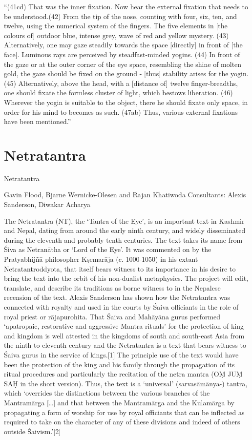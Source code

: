 ``(41cd) That was the inner fixation. Now hear the external fixation that needs to be understood.(42) From the tip of the nose, counting with four, six, ten, and twelve, using the numerical system of the fingers. The five elements in [the colours of] outdoor blue, intense grey, wave of red and yellow mystery. (43) Alternatively, one may gaze steadily towards the space [directly] in front of [the face]. Luminous rays are perceived by steadfast-minded yogins. (44) In front of the gaze or at the outer corner of the eye space, resembling the shine of molten gold, the gaze should be fixed on the ground - [thus] stability arises for the yogin. (45) Alternatively, above the head, with a [distance of] twelve finger-breadths, one should fixate the formless cluster of light, which bestows liberation. (46) Wherever the yogin is suitable to the object, there he should fixate only space, in order for his mind to becomes as such. (47ab) Thus, various external fixations have been mentioned.''
\section{Netratantra}

Netratantra

Gavin Flood, Bjarne Wernicke-Olesen and Rajan Khatiwoda
Consultants: Alexis Sanderson, Diwakar Acharya

The Netratantra (NT), the ‘Tantra of the Eye’, is an important text in Kashmir and Nepal, dating from around the early ninth century, and widely disseminated during the eleventh and probably tenth centuries. The text takes its name from Śiva as Netranātha or ‘Lord of the Eye’. It was commented on by the Pratyabhijñā philosopher Kṣemarāja (c. 1000-1050) in his extant Netratantroddyota, that itself bears witness to its importance in his desire to bring the text into the orbit of his non-dualist metaphysics. The project will edit, translate, and describe its traditions as borne witness to in the Nepalese recension of the text. Alexis Sanderson has shown how the Netratantra was connected with royalty and used in the courts by Śaiva officiants in the role of royal priest or rājapurohita. That Śaiva and Mahāyāna gurus performed ‘apatropaic, restorative and aggressive Mantra rituals’ for the protection of king and kingdom is well attested in the kingdoms of south and south-east Asia from the ninth to eleventh century and the Netratantra is a text that bears witness to Śaiva gurus in the service of kings.[1] The principle use of the text would have been the protection of the king and his family through the propagation of its ritual procedures and particularly the recitation of the netra mantra (OṂ JUṂ SAḤ in the short version). Thus, the text is a ‘universal’ (sarvasāmānya-) tantra, which ‘overrides the distinctions between the various branches of the Mantramārga […] and that between the Mantramārga and the Kulamārga by propagating a form of worship for use by royal officiants that can be inflected as required to take on the character of any of these divisions and indeed of others outside Śaivism.’[2]

